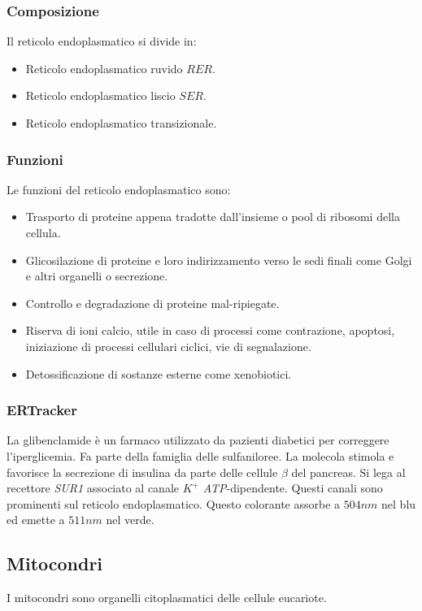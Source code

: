 		\subsubsection{Composizione}
		Il reticolo endoplasmatico si divide in:
		\begin{itemize}
			\item Reticolo endoplasmatico ruvido $RER$.
			\item Reticolo endoplasmatico liscio $SER$.
			\item Reticolo endoplasmatico transizionale.
		\end{itemize}

		\subsubsection{Funzioni}
		Le funzioni del reticolo endoplasmatico sono:
		\begin{multicols}{2}
			\begin{itemize}
				\item Trasporto di proteine appena tradotte dall'insieme o pool di ribosomi della cellula.
				\item Glicosilazione di proteine e loro indirizzamento verso le sedi finali come Golgi e altri organelli o secrezione.
				\item Controllo e degradazione di proteine mal-ripiegate.
				\item Riserva di ioni calcio, utile in caso di processi come contrazione, apoptosi, iniziazione di processi cellulari ciclici, vie di segnalazione.
				\item Detossificazione di sostanze esterne come xenobiotici.
			\end{itemize}
		\end{multicols}

		\subsubsection{ERTracker}
		La glibenclamide \`e un farmaco utilizzato da pazienti diabetici per correggere l'iperglicemia.
		Fa parte della famiglia delle sulfaniloree.
		La molecola stimola e favorisce la secrezione di insulina da parte delle cellule $\beta$ del pancreas.
		Si lega al recettore \emph{SUR1} associato al canale $K^+$ \emph{ATP}-dipendente.
		Questi canali sono prominenti sul reticolo endoplasmatico.
		Questo colorante assorbe a $504\si{nm}$ nel blu ed emette a $511\si{nm}$ nel verde.

	\subsection{Mitocondri}
	I mitocondri sono organelli citoplasmatici delle cellule eucariote.

